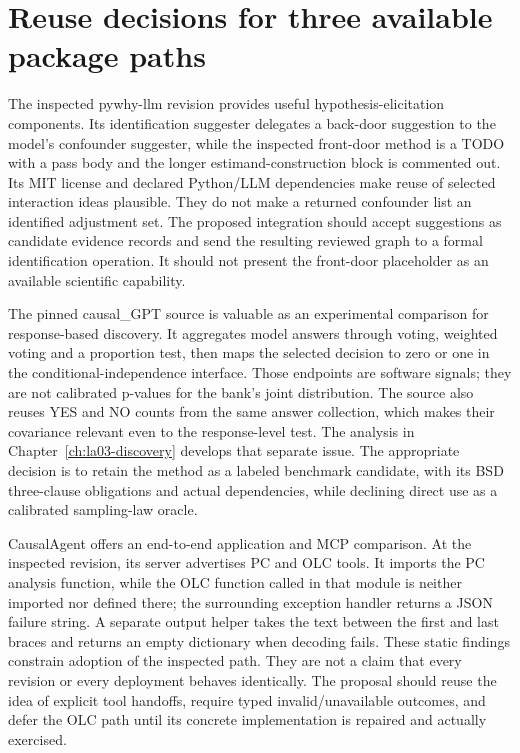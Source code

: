 \hypertarget{reuse-decisions-for-three-available-package-paths}{%
\section{Reuse decisions for three available package
paths}\label{reuse-decisions-for-three-available-package-paths}}

The inspected pywhy-llm revision provides useful hypothesis-elicitation
components. Its identification suggester delegates a back-door
suggestion to the model's confounder suggester, while the inspected
front-door method is a TODO with a pass body and the longer
estimand-construction block is commented out. Its MIT license and
declared Python/LLM dependencies make reuse of selected interaction
ideas plausible. They do not make a returned confounder list an
identified adjustment set. The proposed integration should accept
suggestions as candidate evidence records and send the resulting
reviewed graph to a formal identification operation. It should not
present the front-door placeholder as an available scientific
capability. \citep{v12_la_package_pywhy_llm}

The pinned causal\_GPT source is valuable as an experimental comparison
for response-based discovery. It aggregates model answers through
voting, weighted voting and a proportion test, then maps the selected
decision to zero or one in the conditional-independence interface. Those
endpoints are software signals; they are not calibrated p-values for the
bank's joint distribution. The source also reuses YES and NO counts from
the same answer collection, which makes their covariance relevant even
to the response-level test. The analysis in
Chapter~\ref{ch:la03-discovery} develops that separate
issue. The appropriate decision is to retain the method as a labeled
benchmark candidate, with its BSD three-clause obligations and actual
dependencies, while declining direct use as a calibrated sampling-law
oracle. \citep{v12_la_package_causal_gpt}

CausalAgent offers an end-to-end application and MCP comparison. At the
inspected revision, its server advertises PC and OLC tools. It imports
the PC analysis function, while the OLC function called in that module
is neither imported nor defined there; the surrounding exception handler
returns a JSON failure string. A separate output helper takes the text
between the first and last braces and returns an empty dictionary when
decoding fails. These static findings constrain adoption of the
inspected path. They are not a claim that every revision or every
deployment behaves identically. The proposal should reuse the idea of
explicit tool handoffs, require typed invalid/unavailable outcomes, and
defer the OLC path until its concrete implementation is repaired and
actually exercised. \citep{v12_la_package_causalagent}

